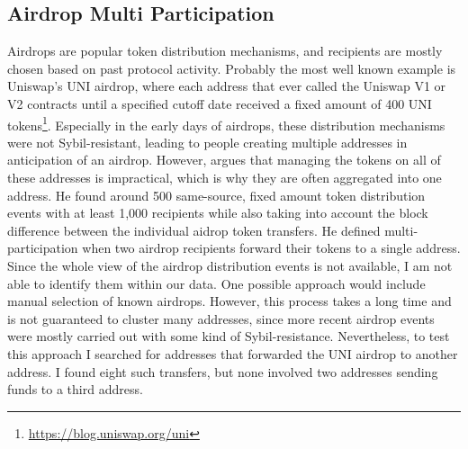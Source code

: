 \documentclass[12pt,a4paper,titlepage,oneside,english]{article}
\begin{document}
\subsection{Airdrop Multi Participation}
Airdrops are popular token distribution mechanisms, and recipients are mostly chosen based on past protocol activity. Probably the most well known example is Uniswap's UNI airdrop, where each address that ever called the Uniswap V1 or V2 contracts until a specified cutoff date received a fixed amount of 400 UNI tokens\footnote{\url{https://blog.uniswap.org/uni}}. Especially in the early days of airdrops, these distribution mechanisms were not Sybil-resistant, leading to people creating multiple addresses in anticipation of an airdrop. However, \cite{FV:17} argues that managing the tokens on all of these addresses is impractical, which is why they are often aggregated into one address. He found around 500 same-source, fixed amount token distribution events with at least 1,000 recipients while also taking into account the block difference between the individual aidrop token transfers. He defined multi-participation when two airdrop recipients forward their tokens to a single address. Since the whole view of the airdrop distribution events is not available, I am not able to identify them within our data. One possible approach would include manual selection of known airdrops. However, this process takes a long time and is not guaranteed to cluster many addresses, since more recent airdrop events were mostly carried out with some kind of Sybil-resistance. Nevertheless, to test this approach I searched for addresses that forwarded the UNI airdrop to another address. I found eight such transfers, but none involved two addresses sending funds to a third address.
\end{document}
